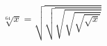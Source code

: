 \documentclass{article}
\begin{document}
\thispagestyle{empty}
\[ \sqrt[64]{x} = \sqrt{\sqrt{\sqrt{\sqrt{\sqrt{\sqrt{x}}}}}} \]
\end{document}
